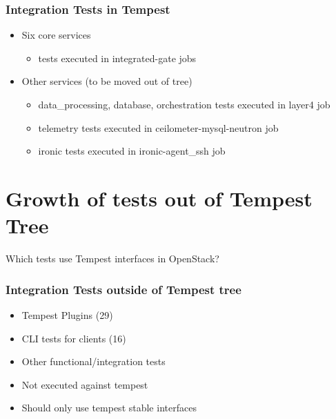 \documentclass[aspectratio=169,11pt,hyperref={colorlinks=true}]{beamer}
\begin{document}
\begin{frame}
    \frametitle{Integration Tests in Tempest}
    \begin{itemize}
        \item{Six core services}
            \begin{itemize}
                \item{tests executed in integrated-gate jobs}
            \end{itemize}
    \end{itemize}
    \text{ }
    \begin{itemize}
        \item{Other services (to be moved out of tree)}
            \begin{itemize}
                \item{data\_processing, database, orchestration tests executed in layer4 job}
                \item{telemetry tests executed in ceilometer-mysql-neutron job}
                \item{ironic tests executed in ironic-agent\_ssh job}
            \end{itemize}
    \end{itemize}
\end{frame}

\section{Growth of tests out of Tempest Tree}
\begin{frame}[c]
    \begin{center}
        \large Which tests use Tempest interfaces in OpenStack?
    \end{center}
\end{frame}

\begin{frame}
    \frametitle{Integration Tests outside of Tempest tree}
    \begin{itemize}
        \item{Tempest Plugins (29)}
        \item{CLI tests for clients (16)}
        \item{Other functional/integration tests}
    \end{itemize}
    \text{ }
    \begin{itemize}
        \item{Not executed against tempest}
        \item{Should only use tempest stable interfaces}
    \end{itemize}
\end{frame}
\end{document}
